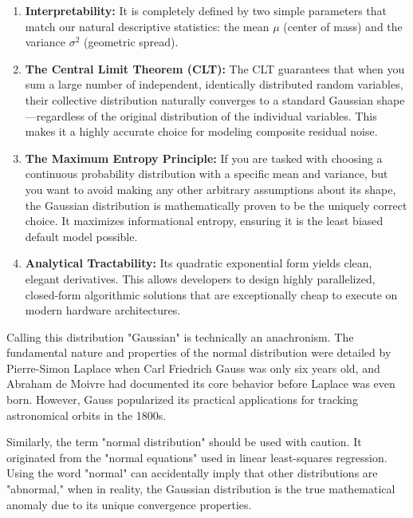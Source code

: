 \documentclass{article}
\begin{document}
\begin{enumerate}
    \item \textbf{Interpretability:} It is completely defined by two simple parameters that match our natural descriptive statistics: the mean $\mu$ (center of mass) and the variance $\sigma^2$ (geometric spread).
    \item \textbf{The Central Limit Theorem (CLT):} The CLT guarantees that when you sum a large number of independent, identically distributed random variables, their collective distribution naturally converges to a standard Gaussian shape—regardless of the original distribution of the individual variables. This makes it a highly accurate choice for modeling composite residual noise.
    \item \textbf{The Maximum Entropy Principle:} If you are tasked with choosing a continuous probability distribution with a specific mean and variance, but you want to avoid making any other arbitrary assumptions about its shape, the Gaussian distribution is mathematically proven to be the uniquely correct choice. It maximizes informational entropy, ensuring it is the least biased default model possible.
    \item \textbf{Analytical Tractability:} Its quadratic exponential form yields clean, elegant derivatives. This allows developers to design highly parallelized, closed-form algorithmic solutions that are exceptionally cheap to execute on modern hardware architectures.
\end{enumerate}

\begin{tcolorbox}[colback=red!5!white, colframe=red!60!black, title=Historical Clarification: What's in a Name?]
Calling this distribution "Gaussian" is technically an anachronism. The fundamental nature and properties of the normal distribution were detailed by Pierre-Simon Laplace when Carl Friedrich Gauss was only six years old, and Abraham de Moivre had documented its core behavior before Laplace was even born. However, Gauss popularized its practical applications for tracking astronomical orbits in the 1800s. 

Similarly, the term "normal distribution" should be used with caution. It originated from the "normal equations" used in linear least-squares regression. Using the word "normal" can accidentally imply that other distributions are "abnormal," when in reality, the Gaussian distribution is the true mathematical anomaly due to its unique convergence properties.
\end{tcolorbox}
\end{document}
